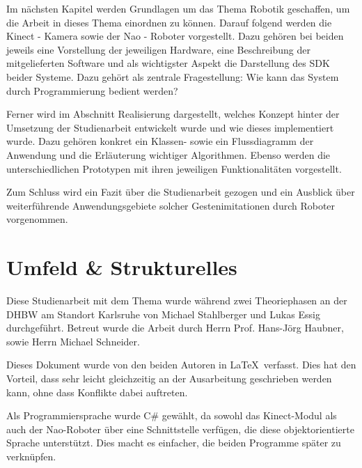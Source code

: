 Im nächsten Kapitel werden Grundlagen um das Thema Robotik geschaffen, um die Arbeit in dieses Thema einordnen zu können. Darauf folgend werden die Kinect - Kamera sowie der Nao - Roboter vorgestellt. Dazu gehören bei beiden jeweils eine Vorstellung der jeweiligen Hardware, eine Beschreibung der mitgelieferten Software und als wichtigster Aspekt die Darstellung des \ac{SDK} beider Systeme. Dazu gehört als zentrale Fragestellung: Wie kann das System durch Programmierung bedient werden?

Ferner wird im Abschnitt Realisierung dargestellt, welches Konzept hinter der Umsetzung der Studienarbeit entwickelt wurde und wie dieses implementiert wurde. Dazu gehören konkret ein Klassen- sowie ein Flussdiagramm der Anwendung und die Erläuterung wichtiger Algorithmen. Ebenso werden die unterschiedlichen Prototypen mit ihren jeweiligen Funktionalitäten vorgestellt. 

Zum Schluss wird ein Fazit über die Studienarbeit gezogen und ein Ausblick über weiterführende Anwendungsgebiete solcher Gestenimitationen durch Roboter vorgenommen.

\section{Umfeld \& Strukturelles}
Diese Studienarbeit mit dem Thema \textit{\Titel} wurde während zwei Theoriephasen an der \ac{DHBW} am Standort Karlsruhe von Michael Stahlberger und Lukas Essig durchgeführt. Betreut wurde die Arbeit durch Herrn Prof. Hans-Jörg Haubner, sowie Herrn Michael Schneider. 

Dieses Dokument wurde von den beiden Autoren in \LaTeX\ verfasst. Dies hat den Vorteil, dass sehr leicht gleichzeitig an der Ausarbeitung geschrieben werden kann, ohne dass Konflikte dabei auftreten. 

Als Programmiersprache wurde C\# gewählt, da sowohl das Kinect-Modul als auch der Nao-Roboter über eine Schnittstelle verfügen, die diese objektorientierte Sprache unterstützt. Dies macht es einfacher, die beiden Programme später zu verknüpfen.

